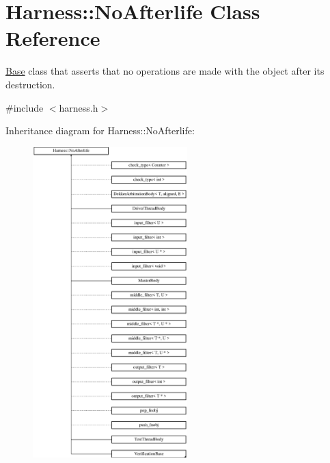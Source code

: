 \hypertarget{classHarness_1_1NoAfterlife}{}\section{Harness\+:\+:No\+Afterlife Class Reference}
\label{classHarness_1_1NoAfterlife}


\hyperlink{structBase}{Base} class that asserts that no operations are made with the object after its destruction.  




{\ttfamily \#include $<$harness.\+h$>$}

Inheritance diagram for Harness\+:\+:No\+Afterlife\+:\begin{figure}[H]
\begin{center}
\leavevmode
\includegraphics[height=12.000000cm]{classHarness_1_1NoAfterlife}
\end{center}
\end{figure}
